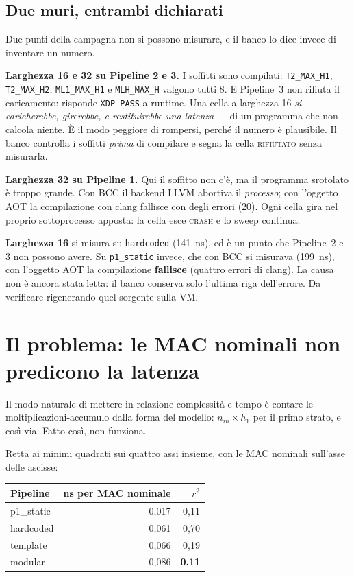 \documentclass[11pt,a4paper,oneside]{report}
\begin{document}
\subsection*{Due muri, entrambi dichiarati}

Due punti della campagna non si possono misurare, e il banco lo dice invece di
inventare un numero.

\textbf{Larghezza 16 e 32 su Pipeline 2 e 3.} I soffitti sono compilati:
\texttt{T2\_MAX\_H1}, \texttt{T2\_MAX\_H2}, \texttt{ML1\_MAX\_H1} e
\texttt{MLH\_MAX\_H} valgono tutti 8. E Pipeline~3 non rifiuta il caricamento:
risponde \texttt{XDP\_PASS} a runtime. Una cella a larghezza 16 \emph{si
caricherebbe, girerebbe, e restituirebbe una latenza} --- di un programma che
non calcola niente. È il modo peggiore di rompersi, perché il numero è
plausibile. Il banco controlla i soffitti \emph{prima} di compilare e segna la
cella \textsc{rifiutato} senza misurarla.

\textbf{Larghezza 32 su Pipeline 1.} Qui il soffitto non c'è, ma il programma
srotolato è troppo grande. Con BCC il backend LLVM abortiva il \emph{processo};
con l'oggetto AOT la compilazione con clang fallisce con degli errori (20). Ogni
cella gira nel proprio sottoprocesso apposta: la cella esce \textsc{crash} e lo
sweep continua.

\textbf{Larghezza 16} si misura su \texttt{hardcoded} (141~ns), ed è un punto che
Pipeline~2 e 3 non possono avere. Su \texttt{p1\_static} invece, che con BCC si
misurava (199~ns), con l'oggetto AOT la compilazione \textbf{fallisce} (quattro
errori di clang). La causa non è ancora stata letta: il banco conserva solo
l'ultima riga dell'errore. Da verificare rigenerando quel sorgente sulla VM.

\section{Il problema: le MAC nominali non predicono la latenza}

Il modo naturale di mettere in relazione complessità e tempo è contare le
moltiplicazioni-accumulo dalla forma del modello: $n_{in} \times h_1$ per il
primo strato, e così via. Fatto così, non funziona.

Retta ai minimi quadrati sui quattro assi insieme, con le MAC nominali sull'asse
delle ascisse:

\begin{center}
\small
\begin{tabular}{@{}lrr@{}}
\toprule
\textbf{Pipeline} & \textbf{ns per MAC nominale} & \textbf{$r^2$} \\
\midrule
p1\_static & 0,017 & 0,11 \\
hardcoded  & 0,061 & 0,70 \\
template   & 0,066 & 0,19 \\
modular    & 0,086 & \textbf{0,11} \\
\bottomrule
\end{tabular}
\end{center}
\end{document}
